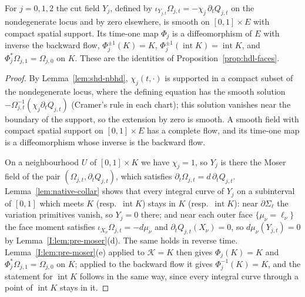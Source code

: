\begin{proposition}\label{prop:shd-moser}
For $j=0,1,2$ the cut field $Y_j$, defined by $\iota_{Y_{j,t}}\Omega_{j,t}=-\chi_j\,\partial_tQ_{j,t}$ on the nondegenerate locus
and by zero elsewhere, is smooth on $[0,1]\times E$ with compact spatial support. Its time-one map $\Phi_j$ is a diffeomorphism
of $E$ with inverse the backward flow, $\Phi_j^{\pm1}(K)=K$, $\Phi_j^{\pm1}(\operatorname{int}K)=\operatorname{int}K$, and
$\Phi_j^*\Omega_{j,1}=\Omega_{j,0}$ on $K$. These are the identities of Proposition~\ref{prop:hdl-faces}.
\end{proposition}
\begin{proof}
By Lemma~\ref{lem:shd-nbhd}, $\chi_j(t,\cdot)$ is supported in a compact subset of the nondegenerate locus, where the
defining equation has the smooth solution $-\Omega_{j,t}^{-1}(\chi_j\partial_tQ_{j,t})$ (Cramer's rule in each chart);
this solution vanishes near the boundary of the support, so the extension by zero is smooth. A smooth field with
compact spatial support on $[0,1]\times E$ has a complete flow, and its time-one map is a diffeomorphism whose inverse is the
backward flow.

On a neighbourhood $U$ of $[0,1]\times K$ we have $\chi_j=1$, so $Y_j$ is there the Moser field of the pair
$(\Omega_{j,t},\partial_tQ_{j,t})$, which satisfies $\partial_t\Omega_{j,t}=d\,\partial_tQ_{j,t}$. Lemma~\ref{lem:native-collar} shows
that every integral curve of $Y_j$ on a subinterval of $[0,1]$ which meets $K$ (resp.\ $\operatorname{int}K$) stays in $K$
(resp.\ $\operatorname{int}K$): near $\partial\Sigma_\ell$ the variation primitives vanish, so $Y_j=0$ there; and near each outer
face $\{\mu_\nu=\ell_\nu\}$ the face moment satisfies $\iota_{X_\nu}\Omega_{j,t}=-d\mu_\nu$ and $\partial_tQ_{j,t}(X_\nu)=0$, so
$d\mu_\nu(Y_{j,t})=0$ by Lemma~\ref{I:lem:pre-moser}(d). The same holds in reverse time. Lemma~\ref{I:lem:pre-moser}(e) applied to
$\mathcal K=K$ then gives $\Phi_j(K)=K$ and $\Phi_j^*\Omega_{j,1}=\Omega_{j,0}$ on $K$; applied to the backward flow it gives
$\Phi_j^{-1}(K)=K$, and the statement for $\operatorname{int}K$ follows in the same way, since every integral curve through a
point of $\operatorname{int}K$ stays in it.
\end{proof}

